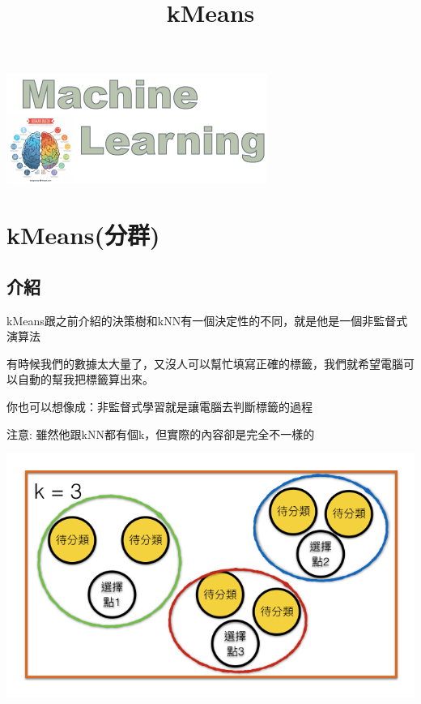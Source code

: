 \documentclass[11pt]{ctexart}
\title{kMeans}
\makeatletter
\def\maxwidth{\ifdim\Gin@nat@width>\linewidth\linewidth
    \else\Gin@nat@width\fi}
\let\Oldincludegraphics\includegraphics
\renewcommand{\includegraphics}[1]{\Oldincludegraphics[width=.8\maxwidth]{#1}}
\makeatother
\begin{document}
    
    
    \maketitle
    
    

    
    \includegraphics{cover.png}

\hypertarget{kmeansux5206ux7fa4}{%
\section{kMeans(分群)}\label{kmeansux5206ux7fa4}}

\hypertarget{ux4ecbux7d39}{%
\subsection{介紹}\label{ux4ecbux7d39}}

kMeans跟之前介紹的決策樹和kNN有一個決定性的不同，就是他是一個非監督式演算法

有時候我們的數據太大量了，又沒人可以幫忙填寫正確的標籤，我們就希望電腦可以自動的幫我把標籤算出來。

你也可以想像成：非監督式學習就是讓電腦去判斷標籤的過程

注意: 雖然他跟kNN都有個k，但實際的內容卻是完全不一樣的

\includegraphics{kmeans.png}
\end{document}
